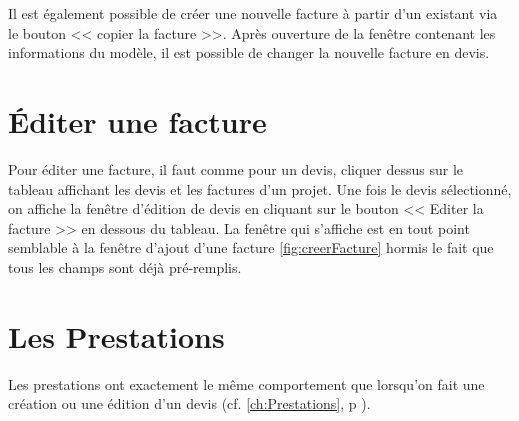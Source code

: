 Il est également possible de créer une  nouvelle facture à partir d'un existant via le bouton << copier la facture >>. Après ouverture de la fenêtre contenant les informations du modèle, il est possible de changer la nouvelle facture en devis. 
\section{Éditer une facture}
Pour éditer une facture, il faut comme pour un devis, cliquer dessus sur le tableau affichant les devis et les factures d'un projet. Une fois le devis sélectionné, on affiche la fenêtre d'édition de devis en cliquant sur le bouton << Editer la facture >> en dessous du tableau.
La fenêtre qui s'affiche est en tout point semblable à la fenêtre d'ajout d'une facture \ref{fig:creerFacture} hormis le fait que tous les champs sont déjà pré-remplis.
\section{Les Prestations}
Les prestations ont exactement le même comportement que lorsqu'on fait une création ou une édition d'un devis (cf. \ref{ch:Prestations}, p \pageref{ch:Prestations}).